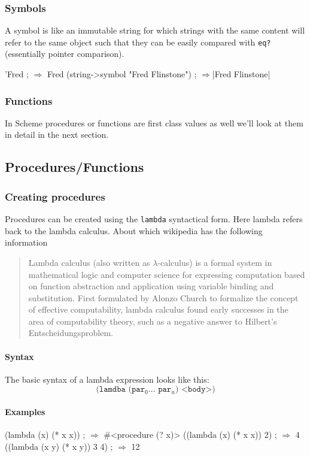 \documentclass[12pt,a4paper,english,twoside]{article}
\begin{document}
\subsubsection{Symbols}
A symbol is like an immutable string for which strings with the same content 
will refer to the same object such that they can be easily compared with 
\texttt{eq?} (essentially pointer comparison).
\begin{schemecode}
'Fred ; $\Rightarrow$ Fred
(string->symbol "Fred Flinstone") ; $\Rightarrow$|Fred Flinstone|
\end{schemecode}
\subsubsection{Functions}
In Scheme procedures or functions are first class values as well we'll look at 
them in detail in the next section.
\subsection{Procedures/Functions}
\subsubsection{Creating procedures}
Procedures can be created using the \texttt{lambda} syntactical form. Here lambda refers back to the lambda calculus. About which wikipedia \cite{lambda} has the following information
\begin{quotation}
Lambda calculus (also written as $\lambda$-calculus) is a formal system in mathematical logic and computer science for expressing computation based on function abstraction and application using variable binding and substitution. First formulated by Alonzo Church to formalize the concept of effective computability, lambda calculus found early successes in the area of computability theory, such as a negative answer to Hilbert's Entscheidungsproblem.
\end{quotation}
\paragraph{Syntax}
The basic syntax of a lambda expression looks like this:
\begin{equation*}
\texttt{(lamdba (par$_{0} \dots$ par$_{n}$) <body>)}
\end{equation*}
\paragraph{Examples}
\begin{schemecode}
(lambda (x) (* x x)) ; $\Rightarrow$ #<procedure (? x)>
((lambda (x) (* x x)) 2) ; $\Rightarrow$ 4 
((lambda (x y) (* x y)) 3 4) ; $\Rightarrow$ 12 
\end{schemecode}
\end{document}

